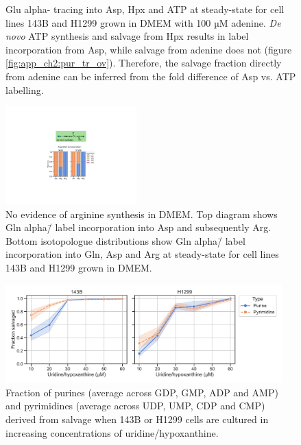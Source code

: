 \begin{figure}[ht]
\begin{subfigure}[b]{0.4\textwidth}
         \caption{}
         \label{fig:app_ch2:ade_sal_H1299}
     \end{subfigure}
        \caption[Glu alpha-\hNi{} tracing into Asp, Hpx and ATP.]{
        Glu alpha-\hNi{} tracing into Asp, Hpx and ATP at steady-state for cell lines 143B and H1299 grown in DMEM with 100 µM adenine.
        \textit{De novo} ATP synthesis and salvage from Hpx results in label incorporation from Asp, while salvage from adenine does not (figure \ref{fig:app_ch2:pur_tr_ov}).
        Therefore, the salvage fraction directly from adenine can be inferred from the fold difference of Asp vs. ATP labelling.
        }
        \label{fig:app_ch2:ade_sal}
\end{figure}

\begin{figure}[ht]
    \centering
    \includegraphics[width=0.45\textwidth]{figures/chap2/app/arg_syn.pdf}
    \caption[No evidence of arginine synthesis in DMEM.]{
    No evidence of arginine synthesis in DMEM.
    Top diagram shows Gln alpha\=/\hNi{} label incorporation into Asp and subsequently Arg.
    Bottom isotopologue distributions show Gln alpha\=/\hNi{} label incorporation into Gln, Asp and Arg at steady-state for cell lines 143B and H1299 grown in DMEM.
    }
    \label{fig:app_ch2:arg_syn}
\end{figure}

\begin{figure}[ht]
    \centering
    \includegraphics[width=0.95\textwidth]{figures/chap2/app/sal_frac_conc.pdf}
    \caption[Salvage as a function of Urd/Hpx concentration.]{
    Fraction of purines (average across GDP, GMP, ADP and AMP) and pyrimidines (average across UDP, UMP, CDP and CMP) derived from salvage when 143B or H1299 cells are cultured in increasing concentrations of uridine/hypoxanthine.
    }
    \label{fig:app_ch2:sal_frac_conc}
\end{figure}





